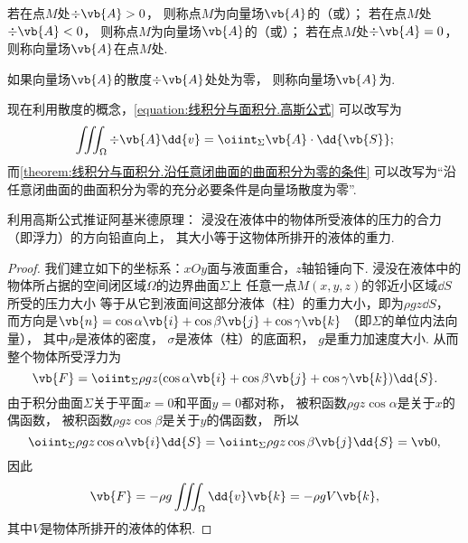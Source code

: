\begin{definition}
若在点\(M\)处\(\div{\vb{A}}>0\)，
则称点\(M\)为向量场\(\vb{A}\)的（或）；
若在点\(M\)处\(\div{\vb{A}}<0\)，
则称点\(M\)为向量场\(\vb{A}\)的（或）；
若在点\(M\)处\(\div{\vb{A}}=0\)，
则称向量场\(\vb{A}\)在点\(M\)处.

如果向量场\(\vb{A}\)的散度\(\div{\vb{A}}\)处处为零，
则称向量场\(\vb{A}\)为.
\end{definition}

现在利用散度的概念，\cref{equation:线积分与面积分.高斯公式} 可以改写为
\begin{equation}\label{equation:线积分与面积分.高斯公式1}
	\iiint_\Omega \div{\vb{A}} \dd{v}
	= \oiint_\Sigma \vb{A} \cdot \dd{\vb{S}};
\end{equation}
而\cref{theorem:线积分与面积分.沿任意闭曲面的曲面积分为零的条件}
可以改写为“沿任意闭曲面的曲面积分为零的充分必要条件是向量场散度为零”.

\begin{example}
利用高斯公式推证阿基米德原理：
浸没在液体中的物体所受液体的压力的合力（即浮力）的方向铅直向上，
其大小等于这物体所排开的液体的重力.
\begin{proof}
我们建立如下的坐标系：\(xOy\)面与液面重合，\(z\)轴铅锤向下.
浸没在液体中的物体所占据的空间闭区域\(\Omega\)的边界曲面\(\Sigma\)上
任意一点\(M(x,y,z)\)的邻近小区域\(\dd{S}\)所受的压力大小
等于从它到液面间这部分液体（柱）的重力大小，即为\(\rho g z \dd{S}\)，
而方向是\(\vb{n}=\cos\alpha\vb{i}+\cos\beta\vb{j}+\cos\gamma\vb{k}\)
（即\(\Sigma\)的单位内法向量），
其中\(\rho\)是液体的密度，
\(\sigma\)是液体（柱）的底面积，
\(g\)是重力加速度大小.
从而整个物体所受浮力为\begin{equation*}
	\vb{F}
	= \oiint_\Sigma \rho g z
		(\cos\alpha\vb{i}+\cos\beta\vb{j}+\cos\gamma\vb{k}) \dd{S}.
\end{equation*}
由于积分曲面\(\Sigma\)关于平面\(x=0\)和平面\(y=0\)都对称，
被积函数\(\rho g z \cos\alpha\)是关于\(x\)的偶函数，
被积函数\(\rho g z \cos\beta\)是关于\(y\)的偶函数，
所以\begin{equation*}
	\oiint_\Sigma \rho g z \cos\alpha \vb{i} \dd{S}
	= \oiint_\Sigma \rho g z \cos\beta \vb{j} \dd{S}
	= \vb0,
\end{equation*}
因此\begin{equation*}
	\vb{F}
	= -\rho g \iiint_\Omega \dd{v} \vb{k}
	= -\rho g V \vb{k},
\end{equation*}
其中\(V\)是物体所排开的液体的体积.
\end{proof}
\end{example}
